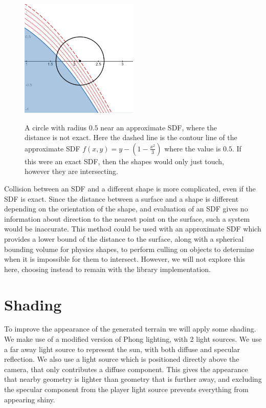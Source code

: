 \documentclass[11pt]{article}
\begin{document}
\begin{figure}
  \caption{A circle with radius $0.5$ near an approximate SDF, where the distance is not exact. Here the dashed line is the contour line of the approximate SDF $f\left(x,y\right)=y-\left(1-\frac{x^2}{3}\right)$ where the value is $0.5$. If this were an exact SDF, then the shapes would only just touch, however they are intersecting.}
  \includegraphics[width=0.5\textwidth]{approx_collision}
  \label{fig:approx_collision}
\end{figure}

Collision between an SDF and a different shape is more complicated, even if the SDF is exact. Since the distance between a surface and a shape is different depending on the orientation of the shape, and evaluation of an SDF gives no information about direction to the nearest point on the surface, such a system would be inaccurate. This method could be used with an approximate SDF which provides a lower bound of the distance to the surface, along with a spherical bounding volume for physics shapes, to perform culling on objects to determine when it is impossible for them to intersect. However, we will not explore this here, choosing instead to remain with the library implementation.  

\section{Shading}
To improve the appearance of the generated terrain we will apply some shading. We make use of a modified version of Phong lighting, with 2 light sources. We use a far away light source to represent the sun, with both diffuse and specular reflection. We also use a light source which is positioned directly above the camera, that only contributes a diffuse component. This gives the appearance that nearby geometry is lighter than geometry that is further away, and excluding the specular component from the player light source prevents everything from appearing shiny.
\end{document}
